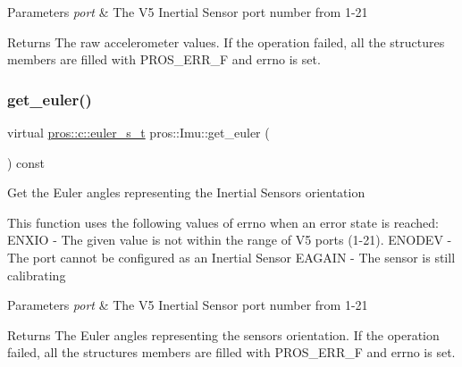 \begin{DoxyParams}{Parameters}
{\em port} & The V5 Inertial Sensor port number from 1-\/21 \\
\hline
\end{DoxyParams}
\begin{DoxyReturn}{Returns}
The raw accelerometer values. If the operation failed, all the structure\textquotesingle{}s members are filled with P\+R\+O\+S\+\_\+\+E\+R\+R\+\_\+F and errno is set. 
\end{DoxyReturn}
\mbox{\label{classpros_1_1Imu_acd2f926bc97121518da774eefe6fc9e2}} 
\subsubsection{\texorpdfstring{get\+\_\+euler()}{get\_euler()}}
{\footnotesize\ttfamily virtual \hyperlink{imu_8h_a93e80020ec907b7e11ac7166e5d01c55}{pros\+::c\+::euler\+\_\+s\+\_\+t} pros\+::\+Imu\+::get\+\_\+euler (\begin{DoxyParamCaption}{ }\end{DoxyParamCaption}) const\hspace{0.3cm}{\ttfamily [virtual]}}

Get the Euler angles representing the Inertial Sensor\textquotesingle{}s orientation

This function uses the following values of errno when an error state is reached\+: E\+N\+X\+IO -\/ The given value is not within the range of V5 ports (1-\/21). E\+N\+O\+D\+EV -\/ The port cannot be configured as an Inertial Sensor E\+A\+G\+A\+IN -\/ The sensor is still calibrating


\begin{DoxyParams}{Parameters}
{\em port} & The V5 Inertial Sensor port number from 1-\/21 \\
\hline
\end{DoxyParams}
\begin{DoxyReturn}{Returns}
The Euler angles representing the sensor\textquotesingle{}s orientation. If the operation failed, all the structure\textquotesingle{}s members are filled with P\+R\+O\+S\+\_\+\+E\+R\+R\+\_\+F and errno is set. 
\end{DoxyReturn}
\mbox{\label{classpros_1_1Imu_a632aecd3cf0866827ba6521dc19f357d}} 
